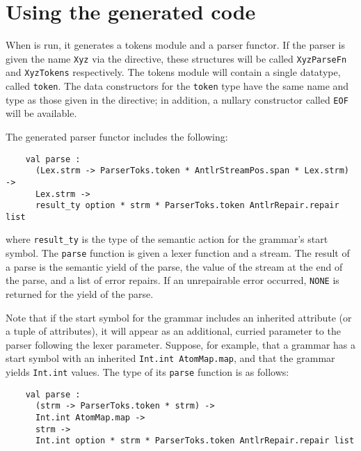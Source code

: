 
\section{Using the generated code}\label{sec:antlr-gencode}

When \antlr{} is run, it generates a tokens module and a parser functor.
If the parser is given the name {\tt Xyz} via the  directive, these structures will be called {\tt XyzParseFn} and {\tt XyzTokens} respectively.  
The tokens module will contain a single datatype, called {\tt token}.  The data constructors for the {\tt token} type have the same name and type as those given in the  directive; in addition, a nullary constructor called {\tt EOF} will be available.

The generated parser functor includes the following:
\begin{verbatim}
    val parse : 
      (Lex.strm -> ParserToks.token * AntlrStreamPos.span * Lex.strm) -> 
      Lex.strm -> 
      result_ty option * strm * ParserToks.token AntlrRepair.repair list
\end{verbatim}
where {\tt result\_ty} is the type of the semantic action for the grammar's start symbol.  
The {\tt parse} function is given a lexer function and a stream.
The result of a parse is the semantic yield of the parse, the value of the stream at the end of the parse, and a list of error repairs.  
If an unrepairable error occurred, {\tt NONE} is returned for the yield of the parse.

Note that if the start symbol for the grammar includes an inherited attribute (or a tuple of attributes), it will appear as an additional, curried parameter to the parser following the lexer parameter.  Suppose, for example, that a grammar has a start symbol with an inherited {\tt Int.int AtomMap.map}, and that the grammar yields {\tt Int.int} values.  The type of its {\tt parse} function is as follows:
\begin{verbatim}
    val parse : 
      (strm -> ParserToks.token * strm) -> 
      Int.int AtomMap.map -> 
      strm -> 
      Int.int option * strm * ParserToks.token AntlrRepair.repair list
\end{verbatim}

